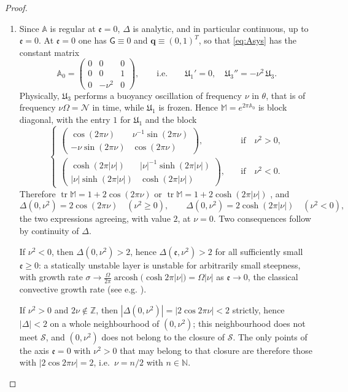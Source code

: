 \documentclass[10pt,a4paper]{amsart}
\newcommand{\Msf}{\mathsf{G}}
\newcommand{\ee}{\mathfrak{e}}
\newcommand{\tr}{\operatorname{tr}}     %
\newcommand{\arcosh}{\operatorname{arcosh}} %
\begin{document}
\begin{proof}
\begin{enumerate}
\begin{itemize}
\end{itemize}
\item[(iii)]
Since $\mathbb A$ is regular at $\ee=0$, $\Delta$ is analytic, and in particular continuous, up to $\ee=0$. At $\ee=0$ one has $\Msf\equiv0$ and $\mathbf q\equiv(0,1)^T$, so that \eqref{eq:Asys} has the constant matrix
\[
\mathbb A_0=\begin{pmatrix}0&0&0\\0&0&1\\0&-\nu^2&0\end{pmatrix},
\qquad\text{i.e.}\qquad
\mathfrak{U}_1'=0,\quad \mathfrak{U}_3''=-\nu^2\,\mathfrak{U}_3 .
\]
Physically, $\mathfrak{U}_3$ performs a buoyancy oscillation of frequency $\nu$ in $\theta$, that is of frequency $\nu\Omega=\mathcal N$ in time, while $\mathfrak{U}_1$ is frozen. Hence $\mathbb M=e^{2\pi\mathbb A_0}$ is block diagonal, with the entry $1$ for $\mathfrak{U}_1$ and the block
\[
\begin{cases}
\begin{pmatrix}
\cos (2\pi\nu) & \nu^{-1}\sin (2\pi\nu)\\
-\nu\sin (2\pi\nu) & \cos (2\pi\nu)
\end{pmatrix},
& \quad\text{if}\quad\nu^2>0,  \\[1.2em]
\begin{pmatrix}
\cosh (2\pi|\nu|) & |\nu|^{-1}\sinh (2\pi|\nu|)\\
|\nu|\sinh (2\pi|\nu|) & \cosh (2\pi|\nu|)
\end{pmatrix},
& \quad\text{if}\quad \nu^2<0.
\end{cases}
\]
 Therefore $\tr\mathbb M=1+2\cos(2\pi\nu)$ or $\tr\mathbb M=1+2\cosh(2\pi|\nu|)$ , and
\[
\Delta(0,\nu^2)=2\cos(2\pi\nu)\quad(\nu^2\ge0),\qquad \Delta(0,\nu^2)=2\cosh(2\pi|\nu|)\quad(\nu^2<0),
\]
the two expressions agreeing, with value $2$, at $\nu=0$. Two consequences follow by continuity of $\Delta$.

If $\nu^2<0$, then $\Delta(0,\nu^2)>2$, hence $\Delta(\ee,\nu^2)>2$ for all sufficiently small $\ee\geq0$: a statically unstable layer is unstable for arbitrarily small steepness, with growth rate $\sigma\to\frac{\Omega}{2\pi}\arcosh\big(\cosh2\pi|\nu|\big)=\Omega|\nu|$ as $\ee\to0$, the classical convective growth rate (see e.g. \cite{Chandrasekhar,Vallis}).

If $\nu^2>0$ and $2\nu\notin\mathbb Z$, then $|\Delta(0,\nu^2)|=|2\cos2\pi\nu|<2$ strictly, hence $|\Delta|<2$ on a whole neighbourhood of $(0,\nu^2)$; this neighbourhood does not meet $\mathcal S$, and $(0,\nu^2)$ does not belong to the closure of $\mathcal S$. The only points of the axis $\ee=0$ with $\nu^2>0$ that may belong to that closure are therefore those with $|2\cos2\pi\nu|=2$, i.e.\ $\nu=n/2$ with $n\in\mathbb N$.
\end{enumerate}
\end{proof}
\end{document}
